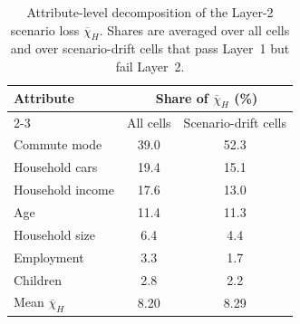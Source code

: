 \begin{table}[h] %
\centering
\caption{Attribute-level decomposition of the Layer-2 scenario loss \(\overline{\chi}_H\). Shares are averaged over all cells and over scenario-drift cells that pass Layer~1 but fail Layer~2.}
\label{tab:chiH_decomposition}
\small
\begin{tabular}{lcc}
\toprule
Attribute & \multicolumn{2}{c}{Share of \(\overline{\chi}_H\) (\%)} \\
\cmidrule(lr){2-3}
 & All cells & Scenario-drift cells \\
\midrule
Commute mode & 39.0 & 52.3 \\
Household cars & 19.4 & 15.1 \\
Household income & 17.6 & 13.0 \\
Age & 11.4 & 11.3 \\
Household size & 6.4 & 4.4 \\
Employment & 3.3 & 1.7 \\
Children & 2.8 & 2.2 \\
\midrule
Mean \(\overline{\chi}_H\) & 8.20 & 8.29 \\
\bottomrule
\end{tabular}
\end{table}
